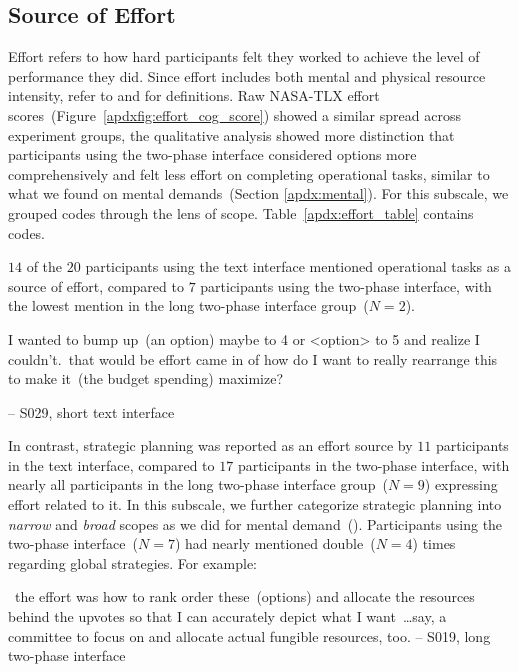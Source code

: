\subsection{Source of Effort}
\label{apdx:effort}
Effort refers to how hard participants felt they worked to achieve the level of performance they did. Since effort includes both mental and physical resource intensity, refer to  and  for definitions. Raw NASA-TLX effort scores~(Figure~\ref{apdxfig:effort_cog_score}) showed a similar spread across experiment groups, the qualitative analysis showed more distinction that participants using the two-phase interface considered options more comprehensively and felt less effort on completing operational tasks, similar to what we found on mental demands~(Section \ref{apdx:mental}). For this subscale, we grouped codes through the lens of scope. Table~\ref{apdx:effort_table} contains codes. 

$14$ of the $20$ participants using the text interface mentioned operational tasks as a source of effort, compared to $7$ participants using the two-phase interface, with the lowest mention in the long two-phase interface group~($N=2$).

\begin{displayquote}
I wanted to bump up~(an option) maybe to 4 or <option> to 5 and realize I couldn't.~\bracketellipsis that would be effort came in of how do I want to really rearrange this to make it~(the budget spending) maximize?

\noindent \hfill -- S029, short text interface
\end{displayquote}

In contrast, strategic planning was reported as an effort source by $11$ participants in the text interface, compared to $17$ participants in the two-phase interface, with nearly all participants in the long two-phase interface group~($N=9$) expressing effort related to it. In this subscale, we further categorize strategic planning into \textit{narrow} and \textit{broad} scopes as we did for mental demand~(). Participants using the two-phase interface~($N=7$) had nearly mentioned double~($N=4$) times regarding global strategies. For example:

\begin{displayquote}
~\bracketellipsis the effort was how to rank order these~(options) and allocate the resources behind the upvotes so that I can accurately depict what I want~\ldots say, a committee to focus on and allocate actual fungible resources, too. \noindent \hfill -- S019, long two-phase interface
\end{displayquote}





